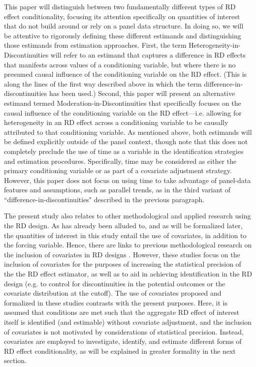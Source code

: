 \documentclass[12pt]{article}
\makeatletter
\renewcommand{\subsection}{\@startsection{subsection}{2}{0mm}{-\baselineskip}{0.25\baselineskip}{\raggedright\normalfont\normalsize\bf}}
\makeatother
\begin{document}
This paper will distinguish between two fundamentally different types of RD effect conditionality, focusing its attention specifically on quantities of interest that do not build around or rely on a panel data structure. In doing so, we will be attentive to rigorously defining these different estimands and distinguishing those estimands from estimation approaches. 
First, the term Heterogeneity-in-Discontinuities will refer to an estimand that captures a difference in RD effects that manifests across values of a conditioning variable, but where there is no presumed causal influence of the conditioning variable on the RD effect. (This is along the lines of the first way described above in which the term difference-in-discontinuities has been used.)
Second, this paper will present an alternative estimand termed Moderation-in-Discontinuities that specifically focuses on the causal influence of the conditioning variable on the RD effect---i.e. allowing for heterogeneity in an RD effect across a conditioning variable to be causally attributed to that conditioning variable. As mentioned above, both estimands will be defined explicitly outside of the panel context, though note that this does not completely preclude the use of time as a variable in the identification strategies and estimation procedures. Specifically, time may be considered as either the primary conditioning variable or as part of a covariate adjustment strategy. However, this paper does not focus on using time to take advantage of panel-data features and assumptions, such as parallel trends, as in the third variant of ``difference-in-discontinuities" described in the previous paragraph.


\subsection{Other Related Work}

The present study also relates to other methodological and applied research using the RD design. As has already been alluded to, and as will be formalized later, the quantities of interest in this study entail the use of covariates, in addition to the forcing variable. Hence, there are links to previous methodological research on the inclusion of covariates in RD designs \citep{calonico2019regression, frolich2019including}. However, these studies focus on the inclusion of covariates for the purposes of increasing the statistical precision of the the RD effect estimator, as well as to aid in achieving identification in the RD design (e.g. to control for discontinuities in the potential outcomes or the covariate distribution at the cutoff). The use of covariates proposed and formalized in these studies contrasts with the present purposes. Here, it is assumed that conditions are met such that the aggregate RD effect of interest itself is identified (and estimable) without covariate adjustment, and the inclusion of covariates is not motivated by considerations of statistical precision. Instead, covariates are employed to investigate, identify, and estimate different forms of RD effect conditionality, as will be explained in greater formality in the next section. 
\end{document}
